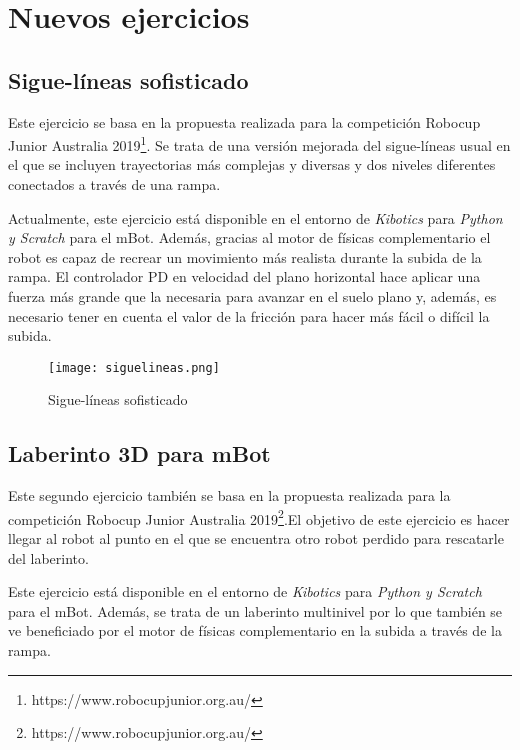 \chapter{Nuevos ejercicios}
\label{chap:nuevos_ejercicios} 

\section{Sigue-líneas sofisticado}
Este ejercicio se basa en la propuesta realizada para la competición Robocup Junior Australia 2019\footnote{https://www.robocupjunior.org.au/}. Se trata de una versión mejorada del sigue-líneas usual en el que se incluyen trayectorias más complejas y diversas y dos niveles diferentes conectados a través de una rampa. \newline

Actualmente, este ejercicio está disponible en el entorno de \textit{Kibotics} para \textit{Python y Scratch} para el mBot. Además, gracias al motor de físicas complementario el robot es capaz de recrear un movimiento más realista durante la subida de la rampa. El controlador PD en velocidad del plano horizontal hace aplicar una fuerza más grande que la necesaria para avanzar en el suelo plano y, además, es necesario tener en cuenta el valor de la fricción para hacer más fácil o difícil la subida.

\begin{figure}[h!]
    \centering
    \texttt{[image: siguelineas.png]}
    \caption{Sigue-líneas sofisticado}
    \label{fig:Sigue-líneas sofisticado}
\end{figure}

\section{ Laberinto 3D para mBot}
Este segundo ejercicio también se basa en la propuesta realizada para la competición Robocup Junior Australia 2019\footnote{https://www.robocupjunior.org.au/}.El objetivo de este ejercicio es hacer llegar al robot al punto en el que se encuentra otro robot perdido para rescatarle del laberinto. \newline

Este ejercicio está disponible en el entorno de \textit{Kibotics} para \textit{Python y Scratch} para el mBot. Además, se trata de un laberinto multinivel por lo que también se ve beneficiado por el motor de físicas complementario en la subida a través de la rampa.

